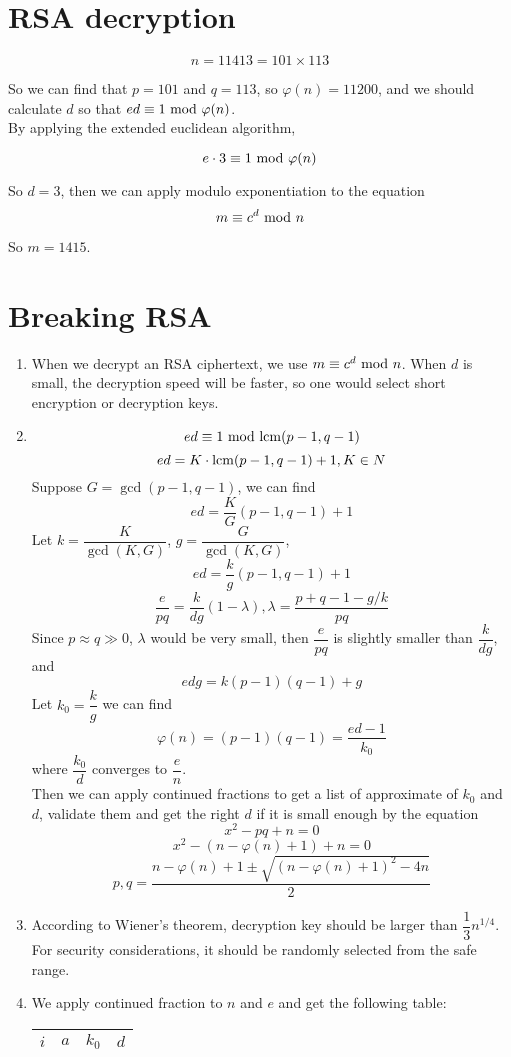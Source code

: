 \documentclass{article}
\renewcommand{\mod}{{\rm\ mod\ }}
\begin{document}
\section{RSA decryption}
$$n=11413=101\times113$$

So we can find that $p=101$ and $q=113$, so $\varphi(n)=11200$, and we should calculate $d$ so that $ed\equiv1\mod \varphi(n)$.\\[-0.5em]

By applying the extended euclidean algorithm,

$$e\cdot3\equiv1\mod \varphi(n)$$

So $d=3$, then we can apply modulo exponentiation to the equation
$$m\equiv c^d\mod n$$


So $m=1415$.

\section{Breaking RSA}
\begin{enumerate}
\item 
When we decrypt an RSA ciphertext, we use $m\equiv c^d\mod n$. When $d$ is small, the decryption speed will be faster, so one would select short encryption or decryption keys.
\item
$$ed\equiv1\mod{\rm lcm}(p-1,q-1)$$
$$ed=K\cdot{\rm lcm}(p-1,q-1)+1,K\in N$$
Suppose $G=\gcd(p-1,q-1)$, we can find
$$ed=\frac{K}{G}(p-1,q-1)+1$$
Let $k=\dfrac{K}{\gcd(K,G)}$, $g=\dfrac{G}{\gcd(K,G)}$,
$$ed=\frac{k}{g}(p-1,q-1)+1$$
$$\frac{e}{pq}=\frac{k}{dg}(1-\lambda),\lambda=\frac{p+q-1-g/k}{pq}$$
Since $p\approx q\gg0$, $\lambda$ would be very small, then $\dfrac{e}{pq}$ is slightly smaller than $\dfrac{k}{dg}$, and
$$edg=k(p-1)(q-1)+g$$
Let $k_0=\dfrac{k}{g}$ we can find
$$\varphi(n)=(p-1)(q-1)=\frac{ed-1}{k_0}$$
where $\dfrac{k_0}{d}$ converges to $\dfrac{e}{n}$.\\
Then we can apply continued fractions to get a list of approximate of $k_0$ and $d$, validate them and get the right $d$ if it is small enough by the equation
$$x^2-pq+n=0$$
$$x^2-(n-\varphi(n)+1)+n=0$$
$$p,q=\frac{n-\varphi(n)+1\pm\sqrt{(n-\varphi(n)+1)^2-4n}}{2}$$
\item
According to Wiener's theorem, decryption key should be larger than $\dfrac{1}{3}n^{1/4}$. For security considerations, it should be randomly selected from the safe range.
\item
We apply continued fraction to $n$ and $e$ and get the following table:
\begin{center}
\begin{tabular}{c|ccc}
$i$ & $a$ & $k_0$ & $d$ \\\hline

\end{tabular}
\end{center}
\end{enumerate}
\end{document}
